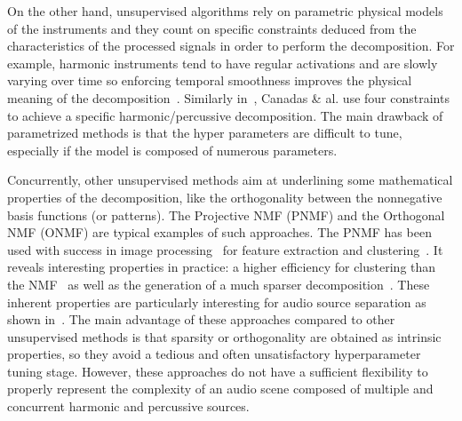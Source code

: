 On the other hand, unsupervised algorithms rely on parametric physical models of the instruments and they count on specific constraints deduced from the characteristics of the processed signals in order to perform the decomposition. For example, harmonic instruments tend to have regular activations and are slowly varying over time so enforcing temporal smoothness improves the physical meaning of the decomposition~\cite{Virtanen}. Similarly in~\cite{canadas2014percussive}, Canadas \& al. use four constraints to achieve a specific harmonic/percussive decomposition. The main drawback of parametrized methods is that the hyper parameters are difficult to tune, especially if the model is composed of numerous parameters. 

Concurrently, other unsupervised methods aim at underlining some mathematical properties of the decomposition, like the orthogonality between the nonnegative basis functions (or patterns). The Projective NMF (PNMF) and the Orthogonal NMF (ONMF) are typical examples of such approaches. The PNMF has been used with success in image processing~\cite{choi} for feature extraction and clustering~\cite{YangOja10}. It reveals interesting properties in practice: a higher efficiency for clustering than the NMF~\cite{choi} as well as the generation of a much sparser decomposition~\cite{YangOja10}. These inherent properties are particularly interesting for audio source separation as shown in~\cite{canadas2014percussive}. 
The main advantage of these approaches compared to other unsupervised methods is that sparsity or orthogonality are obtained as intrinsic properties, so they avoid a tedious and often unsatisfactory hyperparameter tuning stage. However, these approaches do not have a sufficient flexibility to properly represent the complexity of an audio scene composed of multiple and concurrent harmonic and percussive sources.




